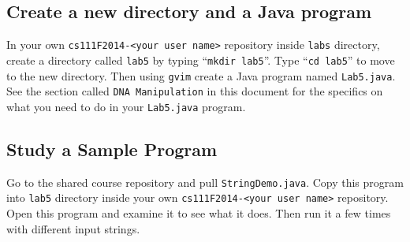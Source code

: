 \vspace{-0.05in}
\subsection*{Create a new directory and a Java program}
\vspace{-0.05in}
In your own {\tt cs111F2014-<your user name>} repository inside {\tt labs} directory, create a directory called {\tt lab5} by typing ``{\tt mkdir lab5}''. Type ``{\tt cd lab5}'' to move to the new directory.  Then using {\tt gvim} create a Java program named {\tt Lab5.java}. See the section called {\tt DNA Manipulation} in this document for the specifics on what you need to do in your {\tt Lab5.java} program.

\vspace{-0.05in}
\subsection*{Study a Sample Program}
\vspace{-0.05in}
Go to the shared course repository and pull {\tt StringDemo.java}. Copy this program into {\tt lab5} directory 
inside your own {\tt cs111F2014-<your user name>} repository. 
Open this program and examine it to see what it does. Then
run it a few times with different input strings.\\

